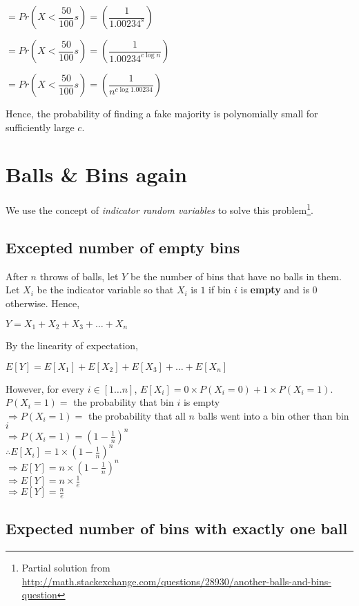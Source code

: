 \documentclass{article}
\begin{document}
$ = Pr(X < \dfrac{50}{100}s) = \left(\dfrac{1}{1.00234^{s}}\right)$

$ = Pr(X < \dfrac{50}{100}s) = \left(\dfrac{1}{1.00234^{c\log{n}}}\right)$

$ = Pr(X < \dfrac{50}{100}s) = \left(\dfrac{1}{n^{c\log{1.00234}}}\right)$

Hence, the probability of finding a fake majority is polynomially small for sufficiently large $c$.

\clearpage

\section{Balls \& Bins again}

We use the concept of \textit{indicator random variables} to solve
this problem\footnote{Partial solution from
  \url{http://math.stackexchange.com/questions/28930/another-balls-and-bins-question}}.

\subsection{Excepted number of empty bins}

After $n$ throws of balls, let $Y$ be the number of bins that have no
balls in them. Let $X_i$ be the indicator variable so that $X_i$ is
$1$ if bin $i$ is \textbf{empty} and is $0$ otherwise. Hence, 

$Y = X_1 + X_2 + X_3 + \ldots{} + X_n$

By the linearity of expectation,

$E[Y] = E[X_1] + E[X_2] + E[X_3] + \ldots{} + E[X_n]$

However, for every $i \in [1\ldots{}n]$, $E[X_i] = 0 \times P(X_i = 0)
+ 1 \times P(X_i = 1)$.\\
$P(X_i = 1) = $ the probability that bin $i$ is empty\\
$\Rightarrow P(X_i = 1) = $ the probability that all $n$ balls went
into a bin other than bin $i$\\
$\Rightarrow P(X_i = 1) = (1 - \frac{1}{n})^n$\\
$\therefore E[X_i] = 1 \times (1 - \frac{1}{n})^n$\\
$\Rightarrow E[Y] = n \times (1 - \frac{1}{n})^n$\\
$\Rightarrow E[Y] = n \times \frac{1}{e}$\\
$\Rightarrow E[Y] = \frac{n}{e}$


\subsection{Expected number of bins with exactly one ball}
\end{document}
